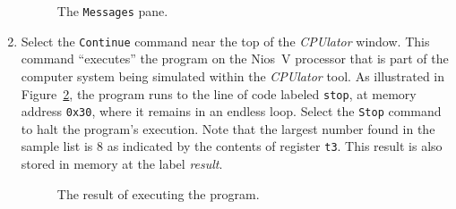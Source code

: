 \documentclass[epsfig,10pt,fullpage]{article}
\begin{document}
\begin{enumerate}
\begin{figure}[h]
	\begin{center}
    \setlength{\fboxsep}{0pt}
	\end{center}
	\caption{The \texttt{Messages} pane.}
\label{fig:success}
\end{figure}

\item Select the \texttt{Continue} command near the top of the {\it CPUlator} window. This
command ``executes'' the program on the Nios~V processor that is part of the computer system 
being simulated within the {\it CPUlator} tool. 
As illustrated in Figure~\ref{fig:end}, the program runs to the line of code labeled
\texttt{stop}, at memory address \texttt{0x30}, where it remains in an endless loop.
Select the \texttt{Stop} command to halt the program's
execution.  Note that the largest number found in the sample list is 8 as indicated
by the contents of register \texttt{t3}. This result is also stored in memory at the label
{\it result}.  

\begin{figure}[H]
	\begin{center}
    \setlength{\fboxsep}{0pt}
	\end{center}
	\caption{The result of executing the program.}
\label{fig:end}
\end{figure} 


\end{enumerate}
\end{document}
